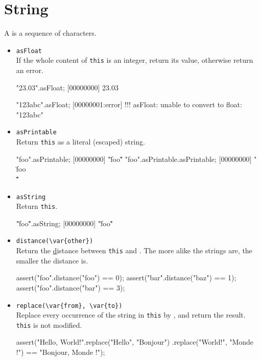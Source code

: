 \section{String}

A  is a sequence of characters.

\begin{itemize}
\item \lstinline|asFloat|\\
  If the whole content of \lstinline|this| is an integer, return its
  value, otherwise return an error.
\begin{urbiscript}
"23.03".asFloat;
[00000000] 23.03

"123abc".asFloat;
[00000001:error] !!! asFloat: unable to convert to float: "123abc"
\end{urbiscript}

\item \lstinline|asPrintable|\\
  Return \lstinline|this| as a literal (escaped) string.
\begin{urbiscript}
"foo".asPrintable;
[00000000] "\"foo\""
"foo".asPrintable.asPrintable;
[00000000] "\"\\\"foo\\\"\""
\end{urbiscript}

\item \lstinline|asString|\\
  Return \lstinline|this|.
\begin{urbiscript}
"\"foo\"".asString;
[00000000] "\"foo\""
\end{urbiscript}

\item \lstinline|distance(\var{other})|\\
  Return the
  \href{http://en.wikipedia.org/wiki/Damerau-Levenshtein_distance,
    Damerau-Levenshtein} distance between \lstinline|this| and
  .  The more alike the strings are, the smaller the
  distance is.
\begin{urbiscript}
assert("foo".distance("foo") == 0);
assert("bar".distance("baz") == 1);
assert("foo".distance("bar") == 3);
\end{urbiscript}

\item \lstinline|replace(\var{from}, \var{to})|\\
  Replace every occurrence of the string  in
  \lstinline|this| by , and return the result.
  \lstinline|this| is not modified.
\begin{urbiscript}
assert("Hello, World!".replace("Hello", "Bonjour")
                      .replace("World!", "Monde !")
       == "Bonjour, Monde !");
\end{urbiscript}


\end{itemize}

